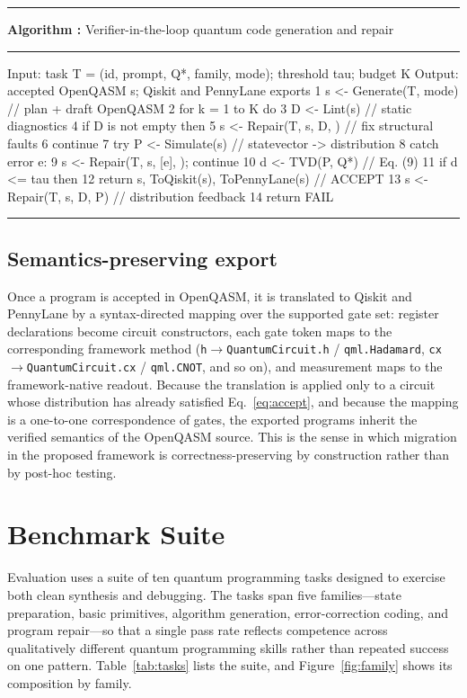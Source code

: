 \documentclass[11pt,a4paper]{article}
\newcounter{algo}
\newenvironment{algobox}[1]{%
  \refstepcounter{algo}\par\medskip\noindent
  \begin{minipage}{\linewidth}\rule{\linewidth}{0.8pt}\par\vspace{2pt}
  \textbf{Algorithm \thealgo:} #1\par\vspace{2pt}\rule{\linewidth}{0.4pt}\par
  \small\ttfamily\obeylines}{%
  \par\rule{\linewidth}{0.8pt}\end{minipage}\par\medskip}
\begin{document}
\begin{algobox}{Verifier-in-the-loop quantum code generation and repair}
Input: task T = (id, prompt, Q*, family, mode); threshold tau; budget K
Output: accepted OpenQASM s; Qiskit and PennyLane exports
1  s <- Generate(T, mode)              // plan + draft OpenQASM
2  for k = 1 to K do
3      D <- Lint(s)                     // static diagnostics
4      if D is not empty then
5          s <- Repair(T, s, D, {})     // fix structural faults
6          continue
7      try P <- Simulate(s)             // statevector -> distribution
8      catch error e:
9          s <- Repair(T, s, [e], {}); continue
10     d <- TVD(P, Q*)                   // Eq. (9)
11     if d <= tau then
12         return s, ToQiskit(s), ToPennyLane(s)   // ACCEPT
13     s <- Repair(T, s, D, P)           // distribution feedback
14 return FAIL
\end{algobox}

\subsection{Semantics-preserving export}
Once a program is accepted in OpenQASM, it is translated to Qiskit and PennyLane by a syntax-directed mapping over the supported gate set: register declarations become circuit constructors, each gate token maps to the corresponding framework method (\texttt{h}$\rightarrow$\texttt{QuantumCircuit.h} / \texttt{qml.Hadamard}, \texttt{cx}$\rightarrow$\texttt{QuantumCircuit.cx} / \texttt{qml.CNOT}, and so on), and measurement maps to the framework-native readout. Because the translation is applied only to a circuit whose distribution has already satisfied Eq.~\eqref{eq:accept}, and because the mapping is a one-to-one correspondence of gates, the exported programs inherit the verified semantics of the OpenQASM source. This is the sense in which migration in the proposed framework is correctness-preserving by construction rather than by post-hoc testing.

\section{Benchmark Suite}
\label{sec:benchmark}

Evaluation uses a suite of ten quantum programming tasks designed to exercise both clean synthesis and debugging. The tasks span five families---state preparation, basic primitives, algorithm generation, error-correction coding, and program repair---so that a single pass rate reflects competence across qualitatively different quantum programming skills rather than repeated success on one pattern. Table~\ref{tab:tasks} lists the suite, and Figure~\ref{fig:family} shows its composition by family.
\end{document}
